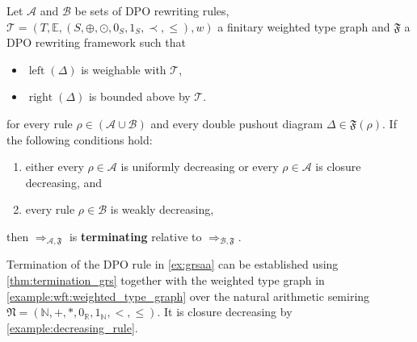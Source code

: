 \begin{theorem} 
    \label{thm:wf:termination_grs}
    Let $\mathcal{A}$ and $\mathcal{B}$ be sets of DPO rewriting rules, $\mathcal{T} = (T,\mathbb{E}, (S, \oplus, \odot, 0_S, 1_S, \prec, \leq), w)$ a finitary weighted type graph and $\mathfrak{F}$ a DPO rewriting framework such that

        \begin{itemize}
            \item \(\operatorname{left}(\Delta)\) is weighable with \(\mathcal{T}\),
            \item \(\operatorname{right}(\Delta)\) is bounded above by \(\mathcal{T}\). 
        \end{itemize}
    for every rule $\rho \in (\mathcal{A }\cup \mathcal{B })$ and every double pushout diagram  
        $\Delta \in \mathfrak{F}(\rho)$. If the following conditions hold:
    \begin{enumerate}
        \item either every $\rho \in \mathcal{A}$ is uniformly decreasing or every $\rho \in \mathcal{A}$ is closure decreasing, and
        \item every rule $\rho \in \mathcal{B}$ is weakly decreasing,
    \end{enumerate}
    then $\Rightarrow_{\mathcal{A},\mathfrak{F}}$ is \textbf{terminating} relative to $\Rightarrow_{\mathcal{B},\mathfrak{F}}$.
\end{theorem} 
\begin{example} 
    \label{example:wf:termination}
    Termination of the DPO rule in \autoref{ex:grsaa} can be established using \autoref{thm:termination_grs} together with the weighted type graph in \autoref{example:wft:weighted_type_graph} over the natural arithmetic semiring $\mathfrak{N} = (\mathbb{N},+,*,0_\mathbb{R},1_\mathbb{N},<,\leq)$. It is closure decreasing by \autoref{example:decreasing_rule}.
\end{example}
